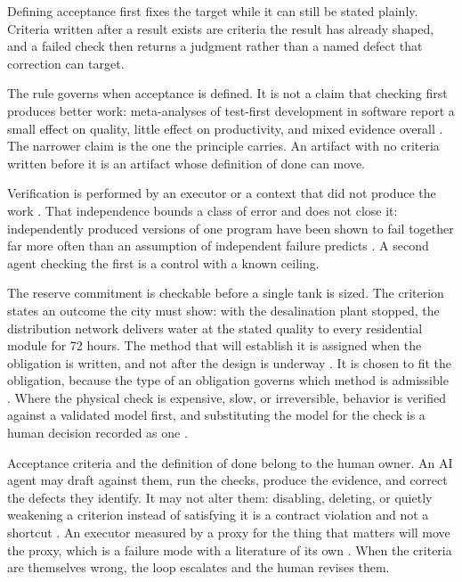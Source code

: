 Defining acceptance first fixes the target while it can still be stated plainly. Criteria written after a result exists are criteria the result has already shaped, and a failed check then returns a judgment rather than a named defect that correction can target.

The rule governs when acceptance is defined. It is not a claim that checking first produces better work: meta-analyses of test-first development in software report a small effect on quality, little effect on productivity, and mixed evidence overall \citep{rafique2013,munir2014}. The narrower claim is the one the principle carries. An artifact with no criteria written before it is an artifact whose definition of done can move.

Verification is performed by an executor or a context that did not produce the work \citep[Section~\hyperlink{nss-7.11}{7.11}]{pss2026}. That independence bounds a class of error and does not close it: independently produced versions of one program have been shown to fail together far more often than an assumption of independent failure predicts \citep{knight1986}. A second agent checking the first is a control with a known ceiling.

The reserve commitment is checkable before a single tank is sized. The criterion states an outcome the city must show: with the desalination plant stopped, the distribution network delivers water at the stated quality to every residential module for 72 hours. The method that will establish it is assigned when the obligation is written, and not after the design is underway \citep[Section~\hyperlink{nss-6.9}{6.9}]{pss2026}. It is chosen to fit the obligation, because the type of an obligation governs which method is admissible \citep[Section~\hyperlink{nss-6.6}{6.6}]{pss2026}. Where the physical check is expensive, slow, or irreversible, behavior is verified against a validated model first, and substituting the model for the check is a human decision recorded as one \citep[Section~\hyperlink{nss-7.16}{7.16}]{pss2026}.

Acceptance criteria and the definition of done belong to the human owner. An AI agent may draft against them, run the checks, produce the evidence, and correct the defects they identify. It may not alter them: disabling, deleting, or quietly weakening a criterion instead of satisfying it is a contract violation and not a shortcut \citep[Sections~\hyperlink{nss-7.2}{7.2} and~\hyperlink{nss-7.12}{7.12}]{pss2026}. An executor measured by a proxy for the thing that matters will move the proxy, which is a failure mode with a literature of its own \citep{skalse2022,manheim2018,specbench2026}. When the criteria are themselves wrong, the loop escalates and the human revises them.

